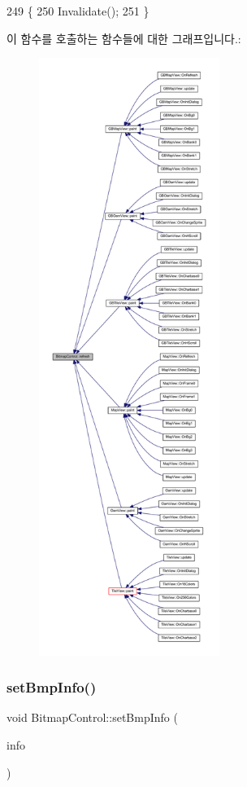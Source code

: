 \begin{DoxyCode}
249 \{
250   Invalidate();
251 \}
\end{DoxyCode}
이 함수를 호출하는 함수들에 대한 그래프입니다.\+:
\nopagebreak
\begin{figure}[H]
\begin{center}
\leavevmode
\includegraphics[height=550pt]{class_bitmap_control_acf061a1e9a4cad90ad2827c14f79caa2_icgraph}
\end{center}
\end{figure}
\mbox{\label{class_bitmap_control_a301c52fc62de4368fccdcdc93cefad0b}} 
\subsubsection{\texorpdfstring{set\+Bmp\+Info()}{setBmpInfo()}}
{\footnotesize\ttfamily void Bitmap\+Control\+::set\+Bmp\+Info (\begin{DoxyParamCaption}\item[{B\+I\+T\+M\+A\+P\+I\+N\+FO $\ast$}]{info }\end{DoxyParamCaption})}



